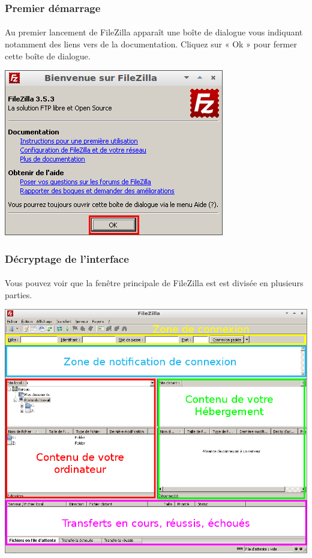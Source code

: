 \documentclass[10pt,a4paper]{article}
\begin{document}
\subsubsection{Premier démarrage}
\paragraph{}Au premier lancement de FileZilla apparaît une boîte de dialogue vous indiquant notamment des liens vers de la documentation. Cliquez sur « Ok » pour fermer cette boîte de dialogue.
\begin{center}
\includegraphics[scale=0.4]{img/0029.png}
\end{center}
\subsubsection{Décryptage de l'interface}
\paragraph{}Vous pouvez voir que la fenêtre principale de FileZilla est est divisée en plusieurs parties.
\begin{center}
\includegraphics[scale=0.4]{img/0030.png}
\end{center}
\end{document}
